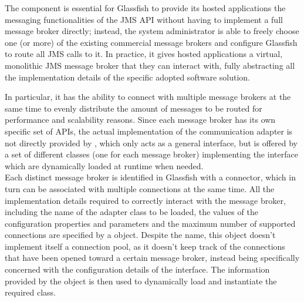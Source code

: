 The  component is essential for Glassfish to provide its hosted applications the messaging functionalities of the JMS API without having to implement a full message broker directly; instead, the system administrator is able to freely choose one (or more) of the existing commercial message brokers and configure Glassfish to route all JMS calls to it. In practice, it gives hosted applications a virtual, monolithic JMS message broker that they can interact with, fully abstracting all the implementation details of the specific adopted software solution.

In particular, it has the ability to connect with multiple message brokers at the same time to evenly distribute the amount of messages to be routed for performance and scalability reasons. Since each message broker has its own specific set of APIs, the actual implementation of the communication adapter is not directly provided by , which only acts as a general interface, but is offered by a set of different classes (one for each message broker) implementing the  interface which are dynamically loaded at runtime when needed.\\

Each distinct message broker is identified in Glassfish with a connector, which in turn can be associated with multiple connections at the same time. All the implementation details required to correctly interact with the message broker, including the name of the adapter class to be loaded, the values of the configuration properties and parameters and the maximum number of supported connections are specified by a  object. Despite the name, this object doesn't implement itself a connection pool, as it doesn't keep track of the connections that have been opened toward a certain message broker, instead being specifically concerned with the configuration details of the interface. The information provided by the  object is then used to dynamically load and instantiate the required  class.\\

